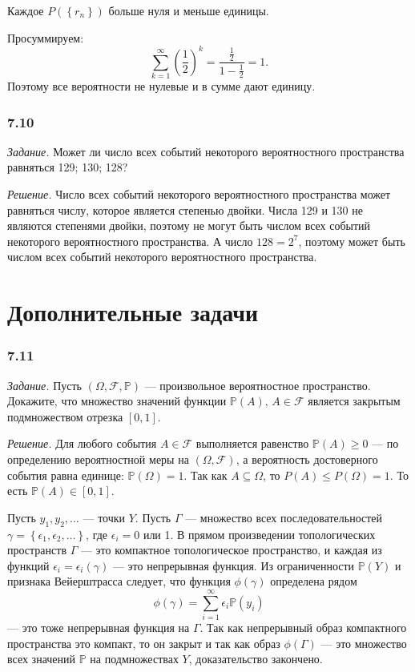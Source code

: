 Каждое $P \left( \left\{ r_n \right\} \right) $ больше нуля и меньше единицы.

Просуммируем:
$$\sum \limits_{k=1}^{ \infty } \left( \frac{1}{2} \right)^k =
\frac{ \frac{1}{2} }{1 - \frac{1}{2} } =
1.$$
Поэтому все вероятности не нулевые и в сумме дают единицу.

\subsubsection*{7.10}

\textit{Задание.} Может ли число всех событий некоторого вероятностного пространства равняться 129; 130; 128?

\textit{Решение.} Число всех событий некоторого вероятностного пространства может равняться числу, которое является степенью двойки.
Числа 129 и 130 не являются степенями двойки, поэтому не могут быть числом всех событий некоторого вероятностного пространства.
А число $128 = 2^7$, поэтому может быть числом всех событий некоторого вероятностного пространства.

\section*{Дополнительные задачи}

\subsubsection*{7.11}

\textit{Задание.} Пусть $ \left( \Omega, \mathcal{F}, \mathbb{P} \right) $ --- произвольное вероятностное пространство.
Докажите,
что множество значений функции
$ \mathbb{P} \left( A \right), \, A \in \mathcal{F} $ является закрытым подмножеством отрезка $ \left[ 0, 1 \right] $.

\textit{Решение.}
Для любого события $A \in \mathcal{F} $ выполняется равенство $ \mathbb{P} \left( A \right) \geq 0$ ---
по определению вероятностной меры на $ \left( \Omega, \mathcal{F} \right) $,
а вероятность достоверного события равна единице: $ \mathbb{P} \left( \Omega \right) = 1$.
Так как $A \subseteq \Omega $, то $P \left( A \right) \leq P \left( \Omega \right) = 1$.
То есть $ \mathbb{P} \left( A \right) \in \left[ 0, 1 \right] $.

Пусть $y_1, y_2, \dotsc $ --- точки $Y$.
Пусть $ \Gamma $ ---
множество всех последовательностей $ \gamma = \left\{ \epsilon_1, \epsilon_2, \dotsc \right\} $, где $ \epsilon_i = 0$ или 1.
В прямом произведении топологических пространств $ \Gamma $ --- это компактное топологическое пространство,
и каждая из функций $ \epsilon_i = \epsilon_i \left( \gamma \right) $ --- это непрерывная функция.
Из ограниченности $ \mathbb{P} \left(Y \right) $ и признака Вейерштрасса следует,
что функция $ \phi \left( \gamma \right) $ определена рядом
$$ \phi \left( \gamma \right) =
\sum \limits_{i=1}^{ \infty } \epsilon_i \mathbb{P} \left( y_i \right) $$
--- это тоже непрерывная функция на $ \Gamma $.
Так как непрерывный образ компактного пространства это компакт,
то он закрыт и так как образ $ \phi \left( \Gamma \right) $ ---
это множество всех значений $ \mathbb{P} $ на подмножествах $Y$, доказательство закончено. 

